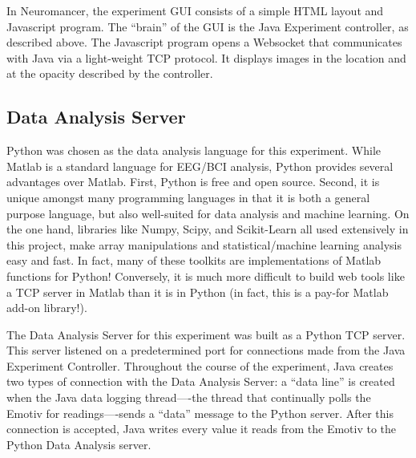 \documentclass[12pt]{report}
\begin{document}
	In Neuromancer, the experiment GUI consists of a simple HTML layout and Javascript program.  The “brain” of the GUI is the Java Experiment controller, as described above.  The Javascript program opens a Websocket\cite{websocket} that communicates with Java via a light-weight TCP protocol.  It displays images in the location and at the opacity described by the controller.

\subsection{Data Analysis Server}
	Python was chosen as the data analysis language for this experiment.  While Matlab is a standard language for EEG/BCI analysis, Python provides several advantages over Matlab.  First, Python is free and open source.  Second, it is unique amongst many programming languages in that it is both a general purpose language, but also well-suited for data analysis and machine learning.  On the one hand, libraries like Numpy, Scipy\cite{scipy}, and Scikit-Learn\cite{sklearn} all used extensively in this project, make array manipulations and statistical/machine learning analysis easy and fast.  In fact, many of these toolkits are implementations of Matlab functions for Python!  Conversely, it is much more difficult to build web tools like a TCP server in Matlab than it is in Python (in fact, this is a pay-for Matlab add-on library!). 

	The Data Analysis Server for this experiment was built as a Python TCP server.  This server listened on a predetermined port for connections made from the Java Experiment Controller.  Throughout the course of the experiment, Java creates two types of connection with the Data Analysis Server: a ``data line'' is created when the Java data logging thread—-the thread that continually polls the Emotiv for readings—-sends a ``data'' message to the Python server.  After this connection is accepted, Java writes every value it reads from the Emotiv to the Python Data Analysis server.  
\end{document}
